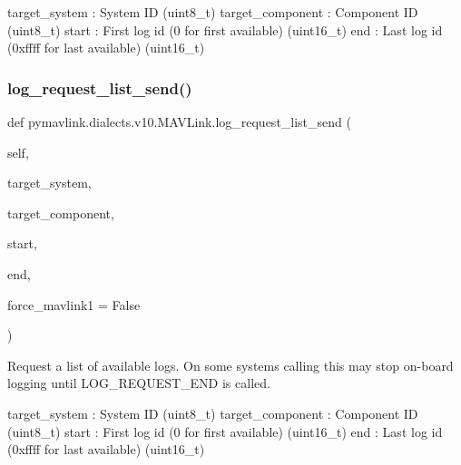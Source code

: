 \begin{DoxyVerb}
\begin{DoxyVerb}
\begin{DoxyVerb}
\begin{DoxyVerb}
\begin{DoxyVerb}
target_system             : System ID (uint8_t)
target_component          : Component ID (uint8_t)
start                     : First log id (0 for first available) (uint16_t)
end                       : Last log id (0xffff for last available) (uint16_t)\end{DoxyVerb}
 \mbox{\label{classpymavlink_1_1dialects_1_1v10_1_1MAVLink_a261367041ce62eec9eb1cd9b02b7ff7f}} 
\subsubsection{\texorpdfstring{log\+\_\+request\+\_\+list\+\_\+send()}{log\_request\_list\_send()}}
{\footnotesize\ttfamily def pymavlink.\+dialects.\+v10.\+M\+A\+V\+Link.\+log\+\_\+request\+\_\+list\+\_\+send (\begin{DoxyParamCaption}\item[{}]{self,  }\item[{}]{target\+\_\+system,  }\item[{}]{target\+\_\+component,  }\item[{}]{start,  }\item[{}]{end,  }\item[{}]{force\+\_\+mavlink1 = {\ttfamily False} }\end{DoxyParamCaption})}

\begin{DoxyVerb}Request a list of available logs. On some systems calling this may
stop on-board logging until LOG_REQUEST_END is called.

target_system             : System ID (uint8_t)
target_component          : Component ID (uint8_t)
start                     : First log id (0 for first available) (uint16_t)
end                       : Last log id (0xffff for last available) (uint16_t)\end{DoxyVerb}
 \mbox{\label{classpymavlink_1_1dialects_1_1v10_1_1MAVLink_a7ee70d2033ff7f5def8443585f95b2da}} 

\end{DoxyVerb}
\end{DoxyVerb}
\end{DoxyVerb}
\end{DoxyVerb}
